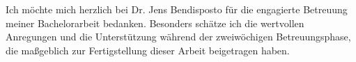 Ich möchte mich herzlich bei Dr. Jens Bendisposto für die engagierte Betreuung meiner Bachelorarbeit bedanken. Besonders schätze ich die wertvollen Anregungen und die Unterstützung während der zweiwöchigen Betreuungsphase, die maßgeblich zur Fertigstellung dieser Arbeit beigetragen haben.